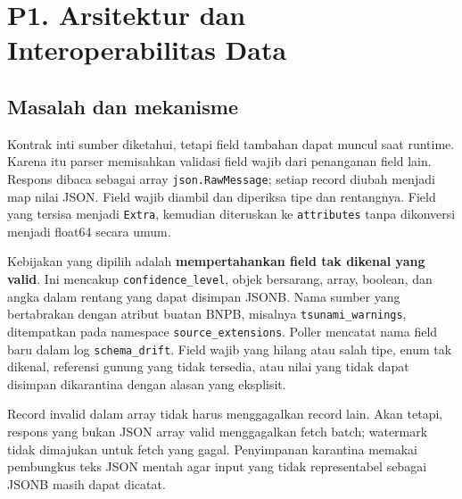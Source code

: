 \section{P1. Arsitektur dan Interoperabilitas Data}
\label{sec:p1}
\subsection{Masalah dan mekanisme}
Kontrak inti sumber diketahui, tetapi field tambahan dapat muncul saat runtime. Karena itu parser memisahkan validasi field wajib dari penanganan field lain. Respons dibaca sebagai array \texttt{json.RawMessage}; setiap record diubah menjadi map nilai JSON. Field wajib diambil dan diperiksa tipe dan rentangnya. Field yang tersisa menjadi \texttt{Extra}, kemudian diteruskan ke \texttt{attributes} tanpa dikonversi menjadi float64 secara umum.

Kebijakan yang dipilih adalah \textbf{mempertahankan field tak dikenal yang valid}. Ini mencakup \texttt{confidence\_level}, objek bersarang, array, boolean, dan angka dalam rentang yang dapat disimpan JSONB. Nama sumber yang bertabrakan dengan atribut buatan BNPB, misalnya \texttt{tsunami\_warnings}, ditempatkan pada namespace \texttt{source\_extensions}. Poller mencatat nama field baru dalam log \texttt{schema\_drift}. Field wajib yang hilang atau salah tipe, enum tak dikenal, referensi gunung yang tidak tersedia, atau nilai yang tidak dapat disimpan dikarantina dengan alasan yang eksplisit.

Record invalid dalam array tidak harus menggagalkan record lain. Akan tetapi, respons yang bukan JSON array valid menggagalkan fetch batch; watermark tidak dimajukan untuk fetch yang gagal. Penyimpanan karantina memakai pembungkus teks JSON mentah agar input yang tidak representabel sebagai JSONB masih dapat dicatat.

